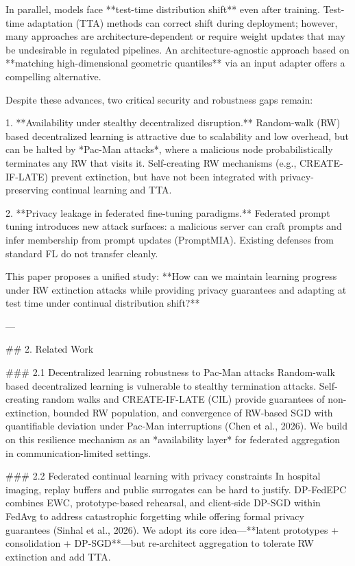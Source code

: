 In parallel, models face **test-time distribution shift** even after training. Test-time adaptation (TTA) methods can correct shift during deployment; however, many approaches are architecture-dependent or require weight updates that may be undesirable in regulated pipelines. An architecture-agnostic approach based on **matching high-dimensional geometric quantiles** via an input adapter offers a compelling alternative.

Despite these advances, two critical security and robustness gaps remain:

1. **Availability under stealthy decentralized disruption.** Random-walk (RW) based decentralized learning is attractive due to scalability and low overhead, but can be halted by *Pac-Man attacks*, where a malicious node probabilistically terminates any RW that visits it. Self-creating RW mechanisms (e.g., CREATE-IF-LATE) prevent extinction, but have not been integrated with privacy-preserving continual learning and TTA.

2. **Privacy leakage in federated fine-tuning paradigms.** Federated prompt tuning introduces new attack surfaces: a malicious server can craft prompts and infer membership from prompt updates (PromptMIA). Existing defenses from standard FL do not transfer cleanly.

This paper proposes a unified study: **How can we maintain learning progress under RW extinction attacks while providing privacy guarantees and adapting at test time under continual distribution shift?**

---

## 2. Related Work  

### 2.1 Decentralized learning robustness to Pac-Man attacks  
Random-walk based decentralized learning is vulnerable to stealthy termination attacks. Self-creating random walks and CREATE-IF-LATE (CIL) provide guarantees of non-extinction, bounded RW population, and convergence of RW-based SGD with quantifiable deviation under Pac-Man interruptions (Chen et al., 2026). We build on this resilience mechanism as an *availability layer* for federated aggregation in communication-limited settings.

### 2.2 Federated continual learning with privacy constraints  
In hospital imaging, replay buffers and public surrogates can be hard to justify. DP-FedEPC combines EWC, prototype-based rehearsal, and client-side DP-SGD within FedAvg to address catastrophic forgetting while offering formal privacy guarantees (Sinhal et al., 2026). We adopt its core idea—**latent prototypes + consolidation + DP-SGD**—but re-architect aggregation to tolerate RW extinction and add TTA.

